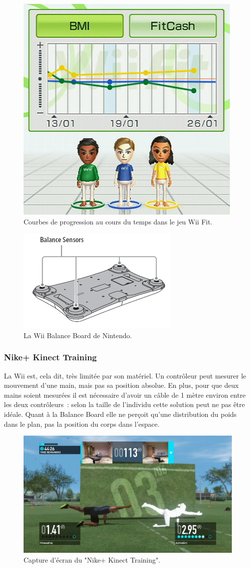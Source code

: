 \begin{figure}[h!]
\centering
\includegraphics[width=0.5\linewidth]{../images/wii_fit}
\caption{Courbes de progression au cours du temps dans le jeu Wii Fit.}
\label{fig:wii_fit}
\end{figure}

\begin{figure}[h!]
\centering
\includegraphics[width=0.5\linewidth]{../images/balance_board}
\caption{La Wii Balance Board de Nintendo.}
\label{fig:balance_board}
\end{figure}

\subsubsection{Nike+ Kinect Training}

La Wii est, cela dit, très limitée par son matériel. Un contrôleur peut mesurer
le mouvement d'une main, mais pas sa position absolue. En plus, pour que deux 
mains soient
mesurées il est nécessaire d'avoir un câble de 1 mètre environ entre les deux
contrôleurs~: selon la taille de l'individu cette solution peut ne pas être
idéale. Quant à la Balance Board elle ne perçoit qu'une distribution du poids dans 
le plan, pas la position du corps dans l'espace.

\begin{figure}[h!]
\centering
\includegraphics[width=0.8\linewidth]{../images/nike_kinect}
\caption{Capture d'écran du "Nike+ Kinect Training".}
\end{figure}


